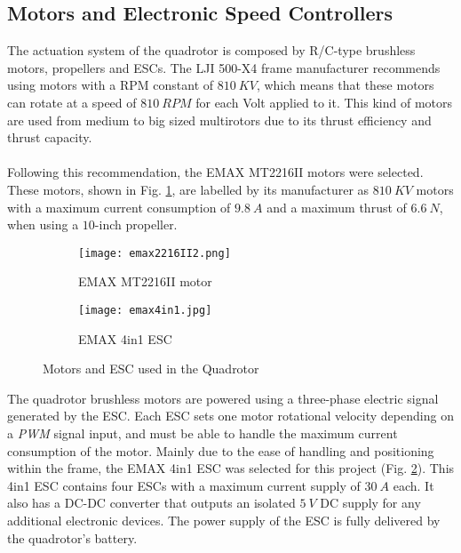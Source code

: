 \subsection{Motors and Electronic Speed Controllers}
The actuation system of the quadrotor is composed by R/C-type brushless motors, propellers and ESCs. The LJI 500-X4 frame manufacturer recommends using motors with a RPM constant of $810\ KV$, which means that these motors can rotate at a speed of $810\ RPM$ for each Volt applied to it. This kind of motors are used from medium to big sized multirotors due to its thrust efficiency and thrust capacity.
\\\\
Following this recommendation, the EMAX MT2216II motors were selected. These motors, shown in Fig. \ref{fig:emaxmotor}, are labelled by its manufacturer as $810\ KV$ motors with a maximum current consumption of $9.8\ A$ and a maximum thrust of $6.6\ N$, when using a $10$-inch propeller.
\begin{figure}[H]
\begin{subfigure}{.5\linewidth}
\centering
\texttt{[image: emax2216II2.png]}    
\caption{EMAX MT2216II motor} 
\label{fig:emaxmotor}
\end{subfigure}
\begin{subfigure}{.5\linewidth}
\centering
\texttt{[image: emax4in1.jpg]}    
\caption{EMAX 4in1 ESC} 
\label{fig:emaxESC}
\end{subfigure}
\caption[Motors and ESC used in the Quadrotor]{Motors and ESC used in the Quadrotor\protect\footnotemark}
\label{fig:motorandesc}
\end{figure}
The quadrotor brushless motors are powered using a three-phase electric signal generated by the ESC. Each ESC sets one motor rotational velocity depending on a \textit{PWM} signal input, and must be able to handle the maximum current consumption of the motor. Mainly due to the ease of handling and positioning within the frame, the EMAX 4in1 ESC was selected for this project (Fig. \ref{fig:emaxESC}). This 4in1 ESC contains four ESCs with a maximum current supply of $30\ A$ each. It also has a DC-DC converter that outputs an isolated $5\ V$ DC supply for any additional electronic devices. The power supply of the ESC is fully delivered by the quadrotor's battery.

